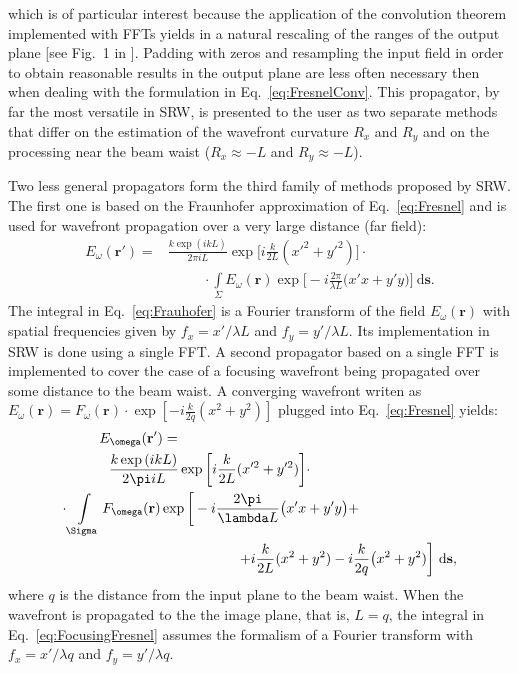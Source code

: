 \documentclass{iucr}              %
\begin{document}
which is of particular interest because the application of the convolution theorem implemented with FFTs yields in a natural rescaling of the ranges of the output plane [see Fig.~1 in \cite{ChubarCelestre}]. Padding with zeros and resampling the input field in order to obtain reasonable results in the output plane are less often necessary then when dealing with the formulation in Eq.~\ref{eq:FresnelConv}. This propagator, by far the most versatile in SRW, is presented to the user as two separate methods that differ on the estimation of the wavefront curvature $R_x$ and $R_y$ and on the processing near the beam waist ($R_x\approx-L$ and $R_y\approx-L$). 

Two less general propagators form the third family of methods proposed by SRW. The first one is based on the Fraunhofer approximation of Eq.~\ref{eq:Fresnel} and is used for wavefront propagation over a very large distance (far field):
 \begin{equation}\label{eq:Frauhofer}
\begin{split}
    E_\omega(\textbf{r}') = &\frac{k\exp{(ikL)}}{2\pi i L}\exp{\bigg[i\frac{k}{2L}(x'^2 + y'^2)\bigg]}\cdot \\
    &\enspace\qquad\cdot\int\limits_{\Sigma}{E_\omega(\textbf{r})\exp{\bigg[-i \frac{2\pi}{\lambda L}\big( x'x + y'y \big)\bigg]}~\mathrm{d}\textbf{s}}.
\end{split}
\end{equation}
The integral in Eq.~\ref{eq:Frauhofer} is a Fourier transform of the field $E_\omega(\textbf{r})$ with spatial frequencies given by $f_x=x'\big/\lambda L$ and $f_y=y'\big/\lambda L$. Its implementation in SRW is done using a single FFT. A second propagator based on a single FFT is implemented to cover the case of a focusing wavefront being propagated over some distance to the beam waist. A converging wavefront writen as $E_\omega(\textbf{r}) = F_\omega(\textbf{r})\cdot\exp{[-i\frac{k}{2q}(x^2 + y^2)]}$ plugged into Eq.~\ref{eq:Fresnel} yields:
\begin{equation}\label{eq:FocusingFresnel}
\begin{split}
E_\omega(\textbf{r}') = \qquad\qquad\qquad\qquad\qquad\qquad\qquad\qquad\qquad\qquad &\\
\frac{k\exp{(ikL)}}{2\pi i L}\exp{\bigg[i\frac{k}{2L}(x'^2 + y'^2)\bigg]}\cdot \qquad\qquad\qquad\qquad\qquad\enspace &\\
\cdot\int\limits_{\Sigma}{F_\omega(\textbf{r})\exp{\bigg[-i \frac{2\pi}{\lambda L}\big( x'x + y'y \big) +}} \qquad\qquad\qquad\quad&\\
\hfill+i\frac{k}{2L}(x^2 + y^2) - i \frac{k}{2 q}\big(x^2+y^2) \bigg]~\mathrm{d}\textbf{s},&
\end{split}
\end{equation}
where $q$ is the distance from the input plane to the beam waist. When the wavefront is propagated to the the image plane, that is, $L=q$, the integral in Eq.~\ref{eq:FocusingFresnel} assumes the formalism of a Fourier transform with $f_x=x'\big/\lambda q$ and $f_y=y'\big/\lambda q$. 
\end{document}
